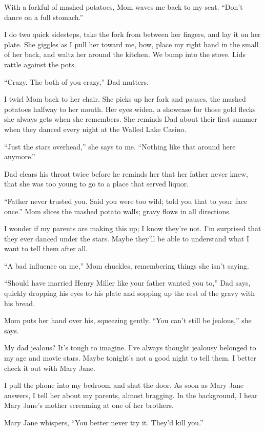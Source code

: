 \documentclass[twoside,10pt]{book}
\begin{document}
With a forkful of mashed potatoes, Mom waves me back to my seat. ``Don't
dance on a full stomach.''

I do two quick sidesteps, take the fork from between her fingers, and
lay it on her plate. She giggles as I pull her toward me, bow, place my
right hand in the small of her back, and waltz her around the kitchen.
We bump into the stove. Lids rattle against the pots.

``Crazy. The both of you crazy,'' Dad mutters.

I twirl Mom back to her chair. She picks up her fork and pauses, the
mashed potatoes halfway to her mouth. Her eyes widen, a showcase for
those gold flecks she always gets when she remembers. She reminds Dad
about their first summer when they danced every night at the Walled Lake
Casino.

``Just the stars overhead,'' she says to me. ``Nothing like that around
here anymore.''

Dad clears his throat twice before he reminds her that her father never
knew, that she was too young to go to a place that served liquor.

``Father never trusted you. Said you were too wild; told you that to
your face once.'' Mom slices the mashed potato walls; gravy flows in all
directions.

I wonder if my parents are making this up; I know they're not. I'm
surprised that they ever danced under the stars. Maybe they'll be able
to understand what I want to tell them after all.

``A bad influence on me,'' Mom chuckles, remembering things she isn't
saying.

``Should have married Henry Miller like your father wanted you to,'' Dad
says, quickly drop­ping his eyes to his plate and sopping up the rest of
the gravy with his bread.

Mom puts her hand over his, squeezing gently. ``You can't still be
jealous,'' she says.

My dad jealous? It's tough to imagine. I've always thought jealousy
belonged to my age and movie stars. Maybe tonight's not a good night to
tell them. I better check it out with Mary Jane.

I pull the phone into my bedroom and shut the door. As soon as Mary Jane
answers, I tell her about my parents, almost bragging. In the
background, I hear Mary Jane's mother screaming at one of her brothers.

Mary Jane whispers, ``You better never try it. They'd kill you.''
\end{document}
